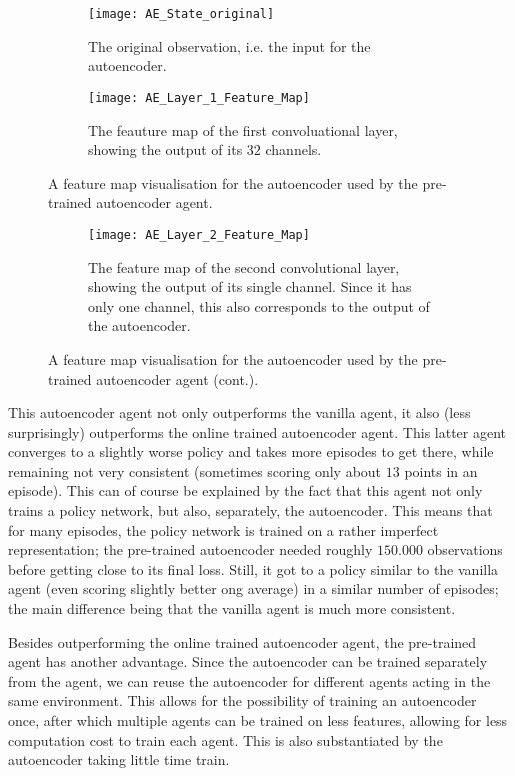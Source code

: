 \begin{figure}[h]
	\centering
	\begin{subfigure}[b]{1\textwidth}
		\texttt{[image: AE\_State\_original]}
		\caption{The original observation, i.e. the input for the autoencoder.}
		\label{fig:ae-featuremap-original} 
	\end{subfigure}
	\begin{subfigure}[b]{1\textwidth}
		\texttt{[image: AE\_Layer\_1\_Feature\_Map]}
		\caption{The feauture map of the first convoluational layer, showing the output of its $32$ channels.}
		\label{fig:ae-featuremap-layer1}
	\end{subfigure}
	\caption{A feature map visualisation for the autoencoder used by the pre-trained autoencoder agent.}
\end{figure}%
\begin{figure}[ht]\ContinuedFloat
	\begin{subfigure}[b]{1\textwidth}
		\texttt{[image: AE\_Layer\_2\_Feature\_Map]}
		\caption{The feature map of the second convolutional layer, showing the output of its single channel. Since it has only one channel, this also corresponds to the output of the autoencoder.}
		\label{fig:ae-featuremap-layer2}
	\end{subfigure}
	\caption{A feature map visualisation for the autoencoder used by the pre-trained autoencoder agent (cont.).}
	\label{fig:ae-featuremap}
\end{figure}

This autoencoder agent not only outperforms the vanilla agent, it also (less surprisingly) outperforms the online trained autoencoder agent. This latter agent converges to a slightly worse policy and takes more episodes to get there, while remaining not very consistent (sometimes scoring only about $13$ points in an episode). This can of course be explained by the fact that this agent not only trains a policy network, but also, separately, the autoencoder. This means that for many episodes, the policy network is trained on a rather imperfect representation; the pre-trained autoencoder needed roughly $150.000$ observations before getting close to its final loss. Still, it got to a policy similar to the vanilla agent (even scoring slightly better ong average) in a similar number of episodes; the main difference being that the vanilla agent is much more consistent. %

Besides outperforming the online trained autoencoder agent, the pre-trained agent has another advantage. Since the autoencoder can be trained separately from the agent, we can reuse the autoencoder for different agents acting in the same environment. This allows for the possibility of training an autoencoder once, after which multiple agents can be trained on less features, allowing for less computation cost to train each agent. This is also substantiated by the autoencoder taking little time train.

